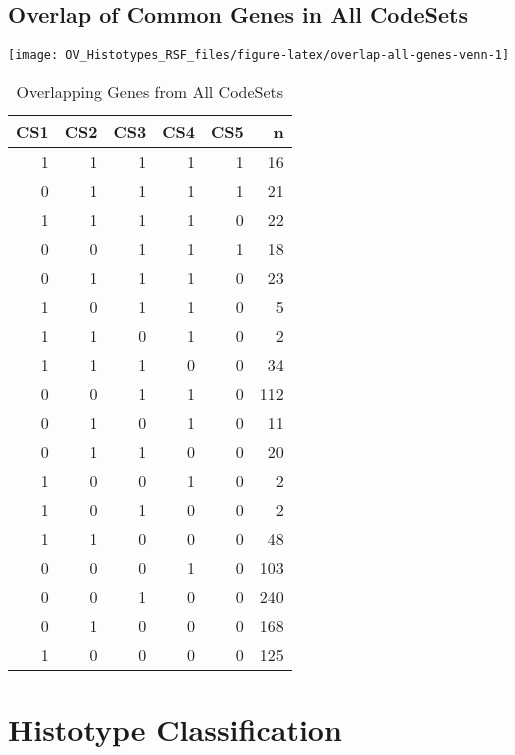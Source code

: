 \documentclass[
]{report}
\begin{document}
\hypertarget{overlap-of-common-genes-in-all-codesets}{%
\subsection{Overlap of Common Genes in All CodeSets}\label{overlap-of-common-genes-in-all-codesets}}

\begin{center}\texttt{[image: OV\_Histotypes\_RSF\_files/figure-latex/overlap-all-genes-venn-1]} \end{center}

\begin{table}

\caption{\label{tab:overlap-genes-all-table}Overlapping Genes from All CodeSets}
\centering
\begin{tabular}[t]{r|r|r|r|r|r}
\hline
CS1 & CS2 & CS3 & CS4 & CS5 & n\\
\hline
1 & 1 & 1 & 1 & 1 & 16\\
\hline
0 & 1 & 1 & 1 & 1 & 21\\
\hline
1 & 1 & 1 & 1 & 0 & 22\\
\hline
0 & 0 & 1 & 1 & 1 & 18\\
\hline
0 & 1 & 1 & 1 & 0 & 23\\
\hline
1 & 0 & 1 & 1 & 0 & 5\\
\hline
1 & 1 & 0 & 1 & 0 & 2\\
\hline
1 & 1 & 1 & 0 & 0 & 34\\
\hline
0 & 0 & 1 & 1 & 0 & 112\\
\hline
0 & 1 & 0 & 1 & 0 & 11\\
\hline
0 & 1 & 1 & 0 & 0 & 20\\
\hline
1 & 0 & 0 & 1 & 0 & 2\\
\hline
1 & 0 & 1 & 0 & 0 & 2\\
\hline
1 & 1 & 0 & 0 & 0 & 48\\
\hline
0 & 0 & 0 & 1 & 0 & 103\\
\hline
0 & 0 & 1 & 0 & 0 & 240\\
\hline
0 & 1 & 0 & 0 & 0 & 168\\
\hline
1 & 0 & 0 & 0 & 0 & 125\\
\hline
\end{tabular}
\end{table}

\hypertarget{histotype-classification}{%
\section{Histotype Classification}\label{histotype-classification}}
\end{document}
